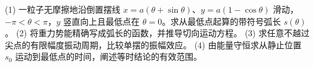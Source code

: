 (1) 一粒子无摩擦地沿倒置摆线 \(x=a(\theta+\sin\theta)\)、\(y=a(1-\cos\theta)\) 滑动，\(-\pi<\theta<\pi\)，\(y\) 竖直向上且最低点在 \(\theta=0\)。求从最低点起算的带符号弧长 \(s(\theta)\)。
(2) 将重力势能精确写成弧长的函数，并推导切向运动方程。
(3) 求任意不越过尖点的有限幅度振动周期，比较单摆的振幅效应。
(4) 由能量守恒求从静止位置 \(s_0\) 运动到最低点的时间，阐述等时结论的有效范围。
